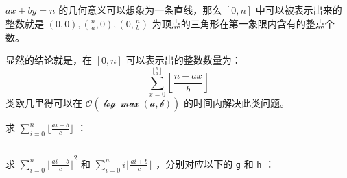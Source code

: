 $ax+by=n$ 的几何意义可以想象为一条直线，那么 $[0,n]$ 中可以被表示出来的整数就是 $(0,0),\left(\frac{n}{a},0\right),\left(0,\frac{n}{b}\right)$ 为顶点的三角形在第一象限内含有的整点个数。

显然的结论就是，在 $[0,n]$ 可以表示出的整数数量为：
$$
\sum_{x=0}^{\lfloor\frac{n}{a}\rfloor}\left\lfloor\dfrac{n-ax}{b}\right\rfloor
$$
类欧几里得可以在 $\mathcal{O(\log{\max(a,b)})}$ 的时间内解决此类问题。

求 $\sum_{i=0}^{n}\lfloor \frac{ai+b}{c} \rfloor$ ：
\inputminted{cpp}{src/number theory/euclid1.cpp}
求 $\sum_{i=0}^{n}{\lfloor \frac{ai+b}{c} \rfloor}^2$ 和 $\sum\limits_{i=0}^{n}i\lfloor \frac{ai+b}{c} \rfloor$ ，分别对应以下的 \verb|g| 和 \verb|h| ：
\inputminted{cpp}{src/number theory/euclid2.cpp}
